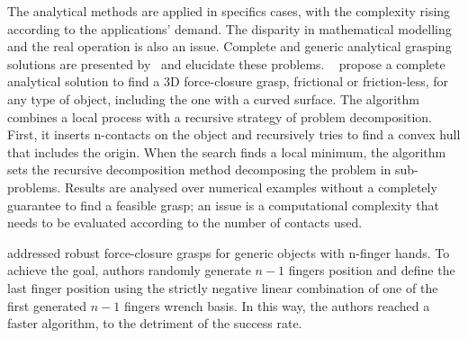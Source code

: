 
The analytical methods are applied in specifics cases, with the complexity rising according to the applications' demand. The disparity in mathematical modelling and the real operation is also an issue. Complete and generic analytical grasping solutions are presented by~\cite{liu2004complete,el2009computing} and elucidate these problems. \citeauthor{liu2004complete}~\cite{liu2004complete} propose a complete analytical solution to find a 3D force-closure grasp, frictional or friction-less, for any type of object, including the one with a curved surface. The algorithm combines a local process with a recursive strategy of problem decomposition. First, it inserts n-contacts on the object and recursively tries to find a convex hull that includes the origin. When the search finds a local minimum, the algorithm sets the recursive decomposition method decomposing the problem in sub-problems. Results are analysed over numerical examples without a completely guarantee to find a feasible grasp; an issue is a computational complexity that needs to be evaluated according to the number of contacts used.

\citeauthor{el2009computing}\cite{el2009computing} addressed robust force-closure grasps for generic objects with n-finger hands. To achieve the goal, authors randomly generate $n-1$ fingers position and define the last finger position using the strictly negative linear combination of one of the first generated $n-1$ fingers wrench basis. In this way, the authors reached a faster algorithm, to the detriment of the success rate.

